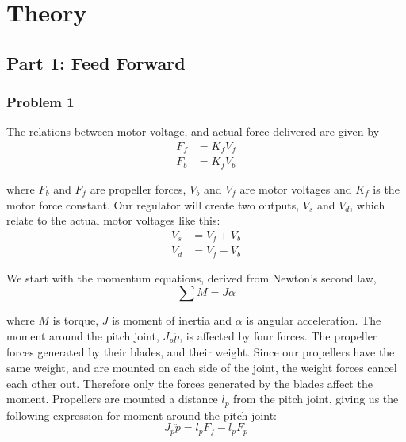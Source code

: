 \section{Theory}



\subsection{Part 1: Feed Forward}
\subsubsection{Problem 1}

The relations between motor voltage, and actual force delivered are given by
\begin{subequations} \label{eq:part1_prob1_forces}
    \begin{align}
        F_f &= K_f V_f \\
        F_b &= K_f V_b
    \end{align}
\end{subequations}

where $F_b$ and $F_f$ are propeller forces, $V_b$ and $V_f$ are motor voltages and $K_f$ is the motor force constant. Our regulator will create two outputs, $V_s$ and $V_d$, which relate to the actual motor voltages like this:
\begin{subequations} \label{eq:voltages}
    \begin{align}
        V_s &= V_f + V_b \label{eq:voltages_vs}\\
        V_d &= V_f - V_b \label{eq:voltages_vd}
    \end{align}
\end{subequations}


We start with the momentum equations, derived from Newton's second law, 
\begin{equation} \label{eq:part1_prob1_momentum_general}
    \sum M = J \alpha
\end{equation}

where $M$ is torque, $J$ is  moment of inertia and $\alpha$ is angular acceleration. The moment around the pitch joint, $J_p\ddot{p}$, is affected by four forces. The propeller forces generated by their blades, and their weight. Since our propellers have the same weight, and are mounted on each side of the joint, the weight forces cancel each other out. 
Therefore only the forces generated by the blades affect the moment. Propellers are mounted a distance $l_p$ from the pitch joint, giving us the following expression for moment around the pitch joint:
\begin{equation}
    J_{p} \ddot{p} = l_p F_f - l_p F_p
\end{equation}

